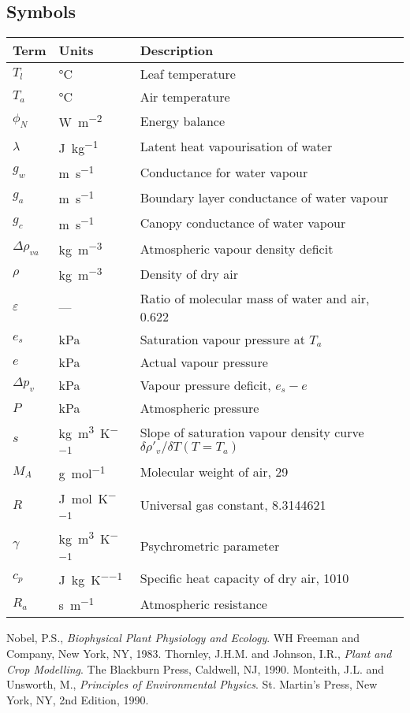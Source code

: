 \documentclass[a4paper]{article}
\begin{document}
\subsection{Symbols}
\begin{tabularx}{\textwidth}{l | l | X}
Term & Units & Description \\
\hline
$T_l$ & \si{\degreeCelsius} & Leaf temperature \\
$T_a$ & \si{\degreeCelsius} & Air temperature \\
$\phi_N$ & \si{\watt\per\metre\squared} & Energy balance \\
$\lambda$ & \si{\joule\per\kilo\gram} & Latent heat vapourisation of water \\
$g_w$ & \si{\metre\per\second} & Conductance for water vapour \\
$g_a$ & \si{\metre\per\second} & Boundary layer conductance of water vapour \\
$g_c$ & \si{\metre\per\second} & Canopy conductance of water vapour \\
$\Delta \rho_{va}$ & \si{\kilo\gram\per\metre\cubed} & Atmospheric vapour density deficit \\
$\rho$ & \si{\kilo\gram\per\metre\cubed} & Density of dry air \\
$\varepsilon$ & --- & Ratio of molecular mass of water and air, 0.622 \\
$e_s$ & \si{\kilo\pascal} & Saturation vapour pressure at $T_a$\\
$e$ & \si{\kilo\pascal} & Actual vapour pressure \\
$\Delta p_v$ & \si{\kilo\pascal} & Vapour pressure deficit, $e_s - e$ \\
$P$ & \si{\kilo\pascal} & Atmospheric pressure \\
$s$ & \si{\kilo\gram\per\metre\cubed\per\kelvin} & Slope of saturation vapour density curve $\delta 
\rho'_v / \delta T (T = T_a)$ \\
$M_A$ & \si{\gram\per\mole} & Molecular weight of air, 29 \\
$R$ & \si{\joule\per\mole\per\kelvin} & Universal gas constant, 8.3144621 \\
$\gamma$ & \si{\kilo\gram\per\metre\cubed\per\kelvin} & Psychrometric parameter \\
$c_p$ & \si{\joule\per\kilo\gram\per\kelvin} & Specific heat capacity of dry air, 1010 \\
$R_a$ & \si{\second\per\metre} & Atmospheric resistance \\
\end{tabularx}

\begin{thebibliography}{}
    Nobel, P.S.,
    \emph{Biophysical Plant Physiology and Ecology}.
    WH Freeman and Company, New York, NY, 1983.
    Thornley, J.H.M. and Johnson, I.R.,
    \emph{Plant and Crop Modelling}.
    The Blackburn Press, Caldwell, NJ, 1990.
    Monteith, J.L. and Unsworth, M.,
    \emph{Principles of Environmental Physics}.
    St. Martin's Press, New York, NY, 2nd Edition, 1990.
\end{thebibliography}
\end{document}
